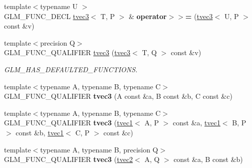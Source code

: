 \begin{DoxyCompactItemize}
\item 
\hypertarget{structglm_1_1tvec3_a42bc834efe85364cd4ec1f3398c433be}{{\footnotesize template$<$typename U $>$ }\\G\-L\-M\-\_\-\-F\-U\-N\-C\-\_\-\-D\-E\-C\-L \hyperlink{structglm_1_1tvec3}{tvec3}$<$ T, P $>$ \& {\bfseries operator$>$$>$=} (\hyperlink{structglm_1_1tvec3}{tvec3}$<$ U, P $>$ const \&v)}\label{structglm_1_1tvec3_a42bc834efe85364cd4ec1f3398c433be}

\item 
\hypertarget{structglm_1_1tvec3_a8079cd060f05356cc1a509691f9b7c88}{{\footnotesize template$<$precision Q$>$ }\\G\-L\-M\-\_\-\-F\-U\-N\-C\-\_\-\-Q\-U\-A\-L\-I\-F\-I\-E\-R \hyperlink{structglm_1_1tvec3_a8079cd060f05356cc1a509691f9b7c88}{tvec3} (\hyperlink{structglm_1_1tvec3}{tvec3}$<$ T, Q $>$ const \&v)}\label{structglm_1_1tvec3_a8079cd060f05356cc1a509691f9b7c88}

\begin{DoxyCompactList}\small\item\em G\-L\-M\-\_\-\-H\-A\-S\-\_\-\-D\-E\-F\-A\-U\-L\-T\-E\-D\-\_\-\-F\-U\-N\-C\-T\-I\-O\-N\-S. \end{DoxyCompactList}\item 
\hypertarget{structglm_1_1tvec3_a222d853387bbb90f1ace041ce3545575}{{\footnotesize template$<$typename A, typename B, typename C$>$ }\\G\-L\-M\-\_\-\-F\-U\-N\-C\-\_\-\-Q\-U\-A\-L\-I\-F\-I\-E\-R {\bfseries tvec3} (A const \&a, B const \&b, C const \&c)}\label{structglm_1_1tvec3_a222d853387bbb90f1ace041ce3545575}

\item 
\hypertarget{structglm_1_1tvec3_af92dab6a7778e5320dd131c840aa23cc}{{\footnotesize template$<$typename A, typename B, typename C$>$ }\\G\-L\-M\-\_\-\-F\-U\-N\-C\-\_\-\-Q\-U\-A\-L\-I\-F\-I\-E\-R {\bfseries tvec3} (\hyperlink{structglm_1_1tvec1}{tvec1}$<$ A, P $>$ const \&a, \hyperlink{structglm_1_1tvec1}{tvec1}$<$ B, P $>$ const \&b, \hyperlink{structglm_1_1tvec1}{tvec1}$<$ C, P $>$ const \&c)}\label{structglm_1_1tvec3_af92dab6a7778e5320dd131c840aa23cc}

\item 
\hypertarget{structglm_1_1tvec3_a258358cc43bea33dab35e1f2f50f7384}{{\footnotesize template$<$typename A, typename B, precision Q$>$ }\\G\-L\-M\-\_\-\-F\-U\-N\-C\-\_\-\-Q\-U\-A\-L\-I\-F\-I\-E\-R {\bfseries tvec3} (\hyperlink{structglm_1_1tvec2}{tvec2}$<$ A, Q $>$ const \&a, B const \&b)}\label{structglm_1_1tvec3_a258358cc43bea33dab35e1f2f50f7384}


\end{DoxyCompactItemize}
